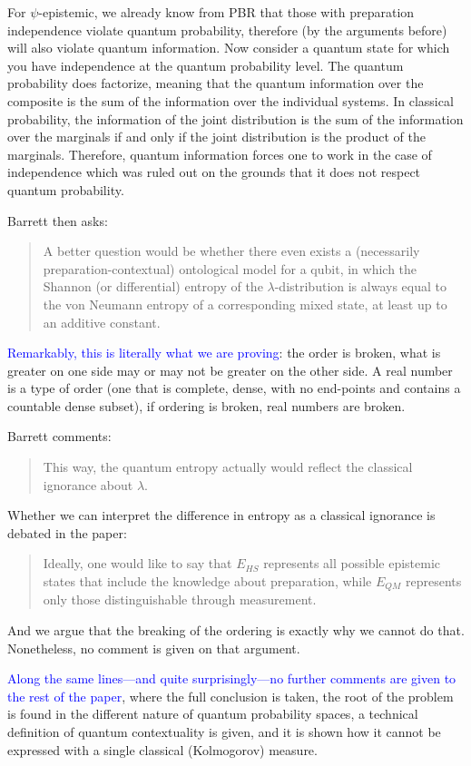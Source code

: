\documentclass[11pt]{article}
\begin{document}
For $\psi$-epistemic, we already know from PBR that those with preparation independence violate quantum probability, therefore (by the arguments before) will also violate quantum information. Now consider a quantum state for which you have independence at the quantum probability level. The quantum probability does factorize, meaning that the quantum information over the composite is the sum of the information over the individual systems. In classical probability, the information of the joint distribution is the sum of the information over the marginals if and only if the joint distribution is the product of the marginals. Therefore, quantum information forces one to work in the case of independence %
which was ruled out on the grounds that it does not respect quantum probability.

Barrett then asks:
\begin{quote}
A better question would be whether there even exists a
(necessarily preparation-contextual) ontological model for a qubit, in which the
Shannon (or differential) entropy of the $\lambda$-distribution is always equal to
the von Neumann entropy of a corresponding mixed state, at least up to an
additive constant. 
\end{quote}
\textcolor{blue}{Remarkably, this is literally what we are proving}: the order is broken, what is greater on one side may or may not be greater on the other side. A real number is a type of order (one that is complete, dense, with no end-points and contains a countable dense subset), if ordering is broken, real numbers are broken.

Barrett comments:
\begin{quote}
This way, the quantum entropy actually would reflect the
classical ignorance about $\lambda$.
\end{quote}
Whether we can interpret the difference in entropy as a classical ignorance is debated in the paper:
\begin{quote}
Ideally, one would like to say that $E_{HS}$ represents all possible epistemic states that include the knowledge about preparation, while $E_{QM}$ represents only those distinguishable through measurement.
\end{quote}
And we argue that the breaking of the ordering is exactly why we cannot do that. Nonetheless, no comment is given on that argument.

\textcolor{blue}{Along the same lines---and quite surprisingly---no further comments are given to the rest of the paper}, where the full conclusion is taken, the root of the problem is found in the different nature of quantum probability spaces, a technical definition of quantum contextuality is given, and it is shown how it cannot be expressed with a single classical (Kolmogorov) measure.
\end{document}
